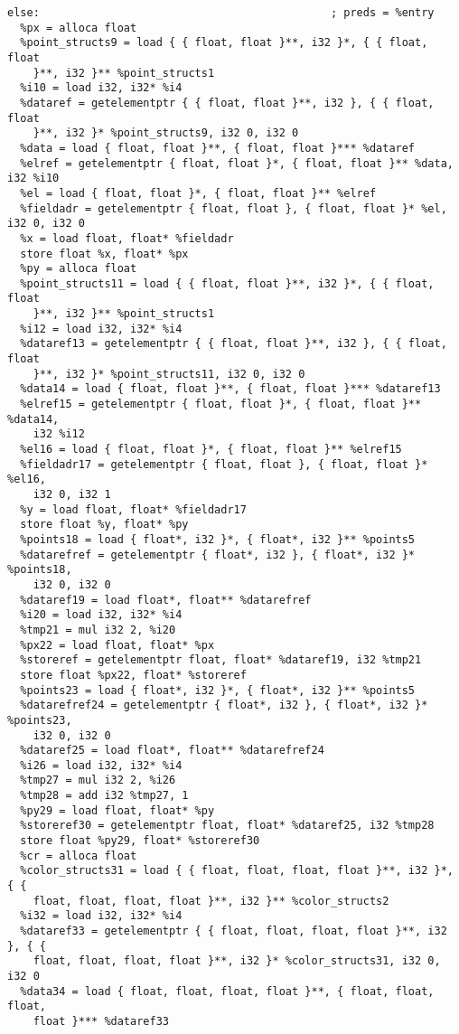 \documentclass[main.tex]{subfiles}
\begin{document}
{\begin{lstlisting}
else:                                             ; preds = %entry
  %px = alloca float
  %point_structs9 = load { { float, float }**, i32 }*, { { float, float 
    }**, i32 }** %point_structs1
  %i10 = load i32, i32* %i4
  %dataref = getelementptr { { float, float }**, i32 }, { { float, float 
    }**, i32 }* %point_structs9, i32 0, i32 0
  %data = load { float, float }**, { float, float }*** %dataref
  %elref = getelementptr { float, float }*, { float, float }** %data, i32 %i10
  %el = load { float, float }*, { float, float }** %elref
  %fieldadr = getelementptr { float, float }, { float, float }* %el, i32 0, i32 0
  %x = load float, float* %fieldadr
  store float %x, float* %px
  %py = alloca float
  %point_structs11 = load { { float, float }**, i32 }*, { { float, float
    }**, i32 }** %point_structs1
  %i12 = load i32, i32* %i4
  %dataref13 = getelementptr { { float, float }**, i32 }, { { float, float
    }**, i32 }* %point_structs11, i32 0, i32 0
  %data14 = load { float, float }**, { float, float }*** %dataref13
  %elref15 = getelementptr { float, float }*, { float, float }** %data14,
    i32 %i12
  %el16 = load { float, float }*, { float, float }** %elref15
  %fieldadr17 = getelementptr { float, float }, { float, float }* %el16, 
    i32 0, i32 1
  %y = load float, float* %fieldadr17
  store float %y, float* %py
  %points18 = load { float*, i32 }*, { float*, i32 }** %points5
  %datarefref = getelementptr { float*, i32 }, { float*, i32 }* %points18,
    i32 0, i32 0
  %dataref19 = load float*, float** %datarefref
  %i20 = load i32, i32* %i4
  %tmp21 = mul i32 2, %i20
  %px22 = load float, float* %px
  %storeref = getelementptr float, float* %dataref19, i32 %tmp21
  store float %px22, float* %storeref
  %points23 = load { float*, i32 }*, { float*, i32 }** %points5
  %datarefref24 = getelementptr { float*, i32 }, { float*, i32 }* %points23,
    i32 0, i32 0
  %dataref25 = load float*, float** %datarefref24
  %i26 = load i32, i32* %i4
  %tmp27 = mul i32 2, %i26
  %tmp28 = add i32 %tmp27, 1
  %py29 = load float, float* %py
  %storeref30 = getelementptr float, float* %dataref25, i32 %tmp28
  store float %py29, float* %storeref30
  %cr = alloca float
  %color_structs31 = load { { float, float, float, float }**, i32 }*, { { 
    float, float, float, float }**, i32 }** %color_structs2
  %i32 = load i32, i32* %i4
  %dataref33 = getelementptr { { float, float, float, float }**, i32 }, { {
    float, float, float, float }**, i32 }* %color_structs31, i32 0, i32 0
  %data34 = load { float, float, float, float }**, { float, float, float, 
    float }*** %dataref33

\end{lstlisting}}
\end{document}
